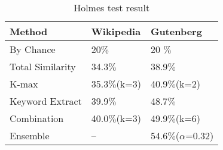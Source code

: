 \documentclass[11pt]{article}
\begin{document}
\begin{table}[h]
\begin{center}
\begin{tabular}[bottom]{|l | l | l |}
\hline
\bf Method & \bf Wikipedia & \bf Gutenberg \\ \hline
By Chance & 20$\%$ & 20 $\%$ \\\hline
Total Similarity & 34.3$\%$ & 38.9$\%$ \\\hline
K-max & 35.3$\%$(k=3) & 40.9$\%$(k=2) \\\hline
Keyword Extract& 39.9$\%$ & 48.7$\%$\\\hline
Combination & 40.0$\%$(k=3) & 49.9$\%$(k=6)\\\hline
Ensemble & -- & 54.6$\%$($\alpha$=0.32)  \\\hline
\end{tabular}
\end{center}
\caption{\label{font-table} Holmes test result }
\end{table}
\end{document}
